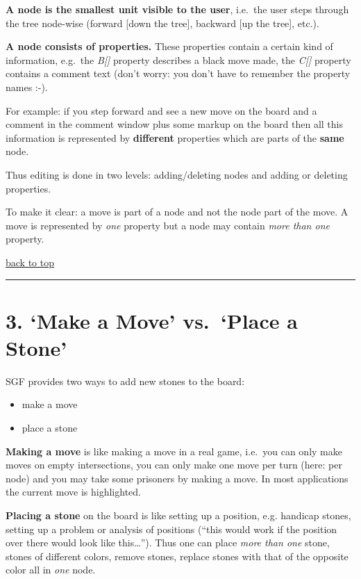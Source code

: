 \textbf{A node is the smallest unit visible to the user}, i.e.~the user
steps through the tree node-wise (forward {[}down the tree{]}, backward
{[}up the tree{]}, etc.).

\textbf{A node consists of properties.} These properties contain a
certain kind of information, e.g.~the \emph{B{[}{]}} property describes
a black move made, the \emph{C{[}{]}} property contains a comment text
(don't worry: you don't have to remember the property names :-).

For example: if you step forward and see a new move on the board and a
comment in the comment window plus some markup on the board then all
this information is represented by \textbf{different} properties which
are parts of the \textbf{same} node.

Thus editing is done in two levels: adding/deleting nodes and adding or
deleting properties.

To make it clear: a move is part of a node and not the node part of the
move. A move is represented by \emph{one} property but a node may
contain \emph{more than one} property.

\href{https://red-bean.com/sgf/user_guide/index.html\#toc}{back to top}

\begin{center}\rule{0.5\linewidth}{0.5pt}\end{center}

\section{3. `Make a Move' vs.~`Place a
Stone'}\label{make-a-move-vs.-place-a-stone}

SGF provides two ways to add new stones to the board:

\begin{itemize}
\item
  make a move
\item
  place a stone
\end{itemize}

\textbf{Making a move} is like making a move in a real game, i.e.~you
can only make moves on empty intersections, you can only make one move
per turn (here: per node) and you may take some prisoners by making a
move. In most applications the current move is highlighted.

\textbf{Placing a stone} on the board is like setting up a position,
e.g. handicap stones, setting up a problem or analysis of positions
(``this would work if the position over there would look like
this\ldots{}''). Thus one can place \emph{more than one} stone, stones
of different colors, remove stones, replace stones with that of the
opposite color all in \emph{one} node.

